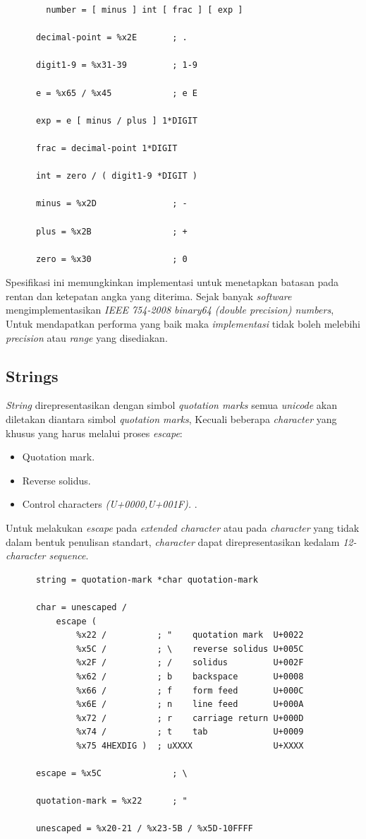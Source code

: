 \begin{lstlisting}
        number = [ minus ] int [ frac ] [ exp ]

      decimal-point = %x2E       ; .

      digit1-9 = %x31-39         ; 1-9

      e = %x65 / %x45            ; e E

      exp = e [ minus / plus ] 1*DIGIT

      frac = decimal-point 1*DIGIT

      int = zero / ( digit1-9 *DIGIT )

      minus = %x2D               ; -

      plus = %x2B                ; +

      zero = %x30                ; 0
\end{lstlisting}
Spesifikasi ini memungkinkan implementasi untuk menetapkan batasan pada rentan  dan ketepatan angka yang diterima. Sejak banyak \textit{software} mengimplementasikan \textit{ IEEE 754-2008 binary64 (double precision) numbers}, Untuk mendapatkan performa yang baik maka \textit{implementasi} tidak boleh melebihi \textit{precision} atau \textit{range} yang disediakan.

\subsection{Strings}
\textit{String} direpresentasikan dengan simbol \textit{quotation marks} semua \textit{unicode} akan diletakan diantara simbol \textit{quotation marks}, Kecuali beberapa \textit{character} yang khusus yang harus melalui proses \textit{escape}:
\begin{itemize}
    \item Quotation mark.
    \item Reverse solidus.
    \item Control characters \textit{(U+0000,U+001F).} .
\end{itemize}
Untuk melakukan \textit{escape} pada \textit{extended character} atau pada \textit{character} yang tidak dalam bentuk penulisan standart, \textit{character} dapat direpresentasikan kedalam \textit{12-character sequence}.

\begin{lstlisting}
      string = quotation-mark *char quotation-mark

      char = unescaped /
          escape (
              %x22 /          ; "    quotation mark  U+0022
              %x5C /          ; \    reverse solidus U+005C
              %x2F /          ; /    solidus         U+002F
              %x62 /          ; b    backspace       U+0008
              %x66 /          ; f    form feed       U+000C
              %x6E /          ; n    line feed       U+000A
              %x72 /          ; r    carriage return U+000D
              %x74 /          ; t    tab             U+0009
              %x75 4HEXDIG )  ; uXXXX                U+XXXX

      escape = %x5C              ; \

      quotation-mark = %x22      ; "

      unescaped = %x20-21 / %x23-5B / %x5D-10FFFF
\end{lstlisting}

